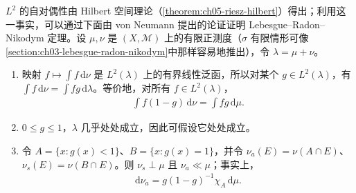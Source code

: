 \documentclass[../../main.tex]{subfiles}
\begin{document}
\begin{exercise}\label{exercise:ch06-radon-nikodym-hilbert}
$L^2$ 的自对偶性由 Hilbert 空间理论（\cref{theorem:ch05-riesz-hilbert}）得出；利用这一事实，可以通过下面由 von Neumann 提出的论证证明 Lebesgue–Radon–Nikodym 定理。设 $\mu,\nu$ 是 $(X,\mathscr M)$ 上的有限正测度（$\sigma$ 有限情形可像\cref{section:ch03-lebesgue-radon-nikodym}中那样容易地推出），令 $\lambda=\mu+\nu$。
\begin{enumerate}
\item\label{item:ch06-rn-hilbert-representation} 映射 $f\mapsto\int f\,\mathrm d\nu$ 是 $L^2(\lambda)$ 上的有界线性泛函，所以对某个 $g\in L^2(\lambda)$，有 $\int f\,\mathrm d\nu=\int fg\,\mathrm d\lambda$。等价地，对所有 $f\in L^2(\lambda)$，
\begin{align*}
\int f(1-g)\,\mathrm d\nu=\int fg\,\mathrm d\mu.
\end{align*}
\item\label{item:ch06-rn-hilbert-bounds} $0\leqslant g\leqslant1$，$\lambda$ 几乎处处成立，因此可假设它处处成立。
\item\label{item:ch06-rn-hilbert-decomposition} 令 $A=\{x:g(x)<1\}$、$B=\{x:g(x)=1\}$，并令 $\nu_a(E)=\nu(A\cap E)$、$\nu_s(E)=\nu(B\cap E)$。则 $\nu_s\perp\mu$ 且 $\nu_a\ll\mu$；事实上，
\begin{align*}
\mathrm d\nu_a=g(1-g)^{-1}\chi_A\,\mathrm d\mu.
\end{align*}
\end{enumerate}
\end{exercise}
\end{document}

